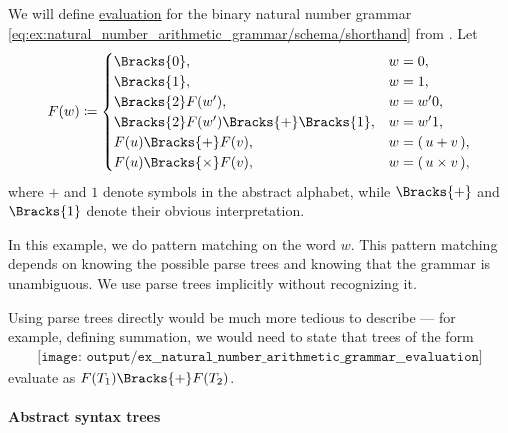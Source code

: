 \begin{example}\label{ex:natural_number_arithmetic_grammar/evaluation}
  We will define \hyperref[rem:evaluation]{evaluation} for the binary natural number grammar \eqref{eq:ex:natural_number_arithmetic_grammar/schema/shorthand} from . Let
  \begin{equation*}
    F(w) \coloneqq \begin{cases}
      \Bracks{0},                             &w = 0, \\
      \Bracks{1},                             &w = 1, \\
      \Bracks{2} F(w'),                       &w = w' 0, \\
      \Bracks{2} F(w') \Bracks{+} \Bracks{1}, &w = w' 1, \\
      F(u) \Bracks{+} F(v),                   &w = \mathtt{(} \thinspace u + v \thinspace \mathtt{)}, \\
      F(u) \Bracks{\times} F(v),              &w = \mathtt{(} \thinspace u \times v \thinspace \mathtt{)},
    \end{cases}
  \end{equation*}
  where \( + \) and \( 1 \) denote symbols in the abstract alphabet, while \( \Bracks{+} \) and \( \Bracks{1} \) denote their obvious interpretation.

  In this example, we do pattern matching on the word \( w \). This pattern matching depends on knowing the possible parse trees and knowing that the grammar is unambiguous. We use parse trees implicitly without recognizing it.

  Using parse trees directly would be much more tedious to describe --- for example, defining summation, we would need to state that trees of the form
  \begin{equation*}
    \begin{aligned}
      \texttt{[image: output/ex\_\_natural\_number\_arithmetic\_grammar\_\_evaluation]}
    \end{aligned}
  \end{equation*}
  evaluate as \( F(T_1) \Bracks{+} F(T_2) \).
\end{example}

\paragraph{Abstract syntax trees}

